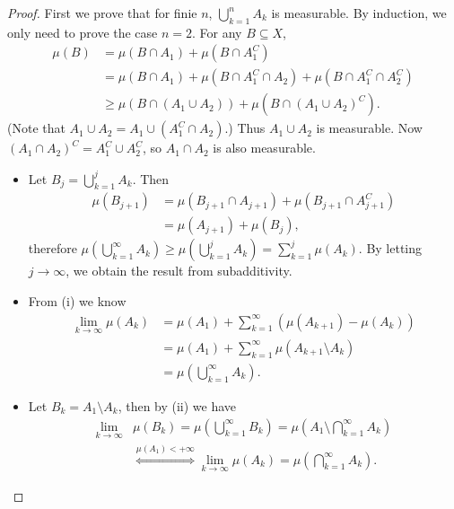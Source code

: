     \begin{proof}
        First we prove that for finie $n$, $\bigcup_{k=1}^{n}A_{k}$ is measurable. By induction, we only need to prove the case $n=2$. For any $B \subseteq X$,
        $$
        \begin{aligned}
        \mu(B)&= \mu(B\cap A_1)+\mu(B\cap A_1^{C}) \\
        &= \mu(B\cap A_1)+\mu(B\cap A_1^{C}\cap A_2)+\mu(B\cap A_1^{C}\cap A_{2}^{C}) \\
        &\ge \mu(B\cap (A_1 \cup A_2)) + \mu(B\cap (A_1 \cup A_2)^{C}).
        \end{aligned}
        $$
        (Note that $A_1\cup A_2=A_1\cup (A_1^{C}\cap A_2)$.) Thus $A_1 \cup A_2$ is measurable. Now $(A_1\cap A_2)^{C}=A_1^{C}\cup A_2^{C}$, so $A_1\cap A_2$ is also measurable.
        \begin{itemize}
            \item[(i)] Let $B_{j}=\bigcup_{k=1}^{j}A_{k}$. Then
            $$
            \begin{aligned}
            \mu(B_{j+1})&= \mu(B_{j+1}\cap A_{j+1}) + \mu(B_{j+1}\cap A_{j+1}^{C}) \\
            &= \mu(A_{j+1}) + \mu(B_{j}),
            \end{aligned}
            $$
            therefore $\mu(\bigcup_{k=1}^{\infty}A_{k})\ge \mu(\bigcup_{k=1}^{j}A_{k})=\sum_{k=1}^{j}\mu(A_{k})$. By letting $j \to \infty$, we obtain the result from subadditivity.
            \item[(ii)] From (i) we know
            $$
            \begin{aligned}
            \lim_{k \to \infty}\mu(A_{k}) &= \mu(A_1)+ \sum_{k=1}^{\infty}(\mu(A_{k+1})-\mu(A_{k})) \\
            &= \mu(A_1)+\sum_{k=1}^{\infty}\mu(A_{k+1}\setminus A_{k}) \\
            &= \mu\left(\bigcup_{k=1}^{\infty}A_{k}\right).
            \end{aligned}
            $$
            \item[(iii)] Let $B_{k}=A_1\setminus A_{k}$, then by (ii) we have
            $$
            \begin{aligned}
            \lim_{k \to \infty}&\mu(B_{k}) = \mu(\bigcup _{k=1}^{\infty}B_{k}) = \mu(A_1 \setminus \bigcap_{k=1}^{\infty} A_{k}) \\
            &\stackrel{\mu(A_1)<+\infty}{\Longleftrightarrow} \lim_{k \to \infty}\mu(A_{k}) =\mu \left(\bigcap_{k=1}^{\infty}A_{k}\right).
            \end{aligned}
$$
\end{itemize}
\end{proof}
